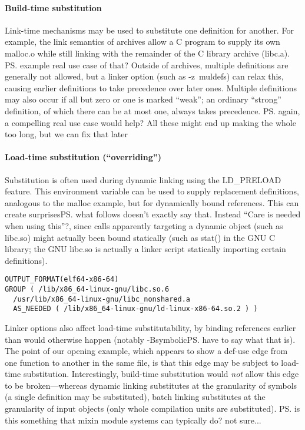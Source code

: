 \paragraph{Build-time substitution}
Link-time mechanisms may be used to substitute one definition for another.
For example, the link semantics of archives allow a C program
to supply its own \textsf{malloc.o} while still linking with 
the remainder of the C library archive (\textsf{libc.a}).
\ps{example real use case of that?}
Outside of archives, multiple definitions are generally not allowed,
but a linker option (such as \textsf{-z~muldefs}) can relax this, 
causing earlier definitions to take precedence over later ones.
Multiple definitions may also occur if all but zero or one is marked ``weak'';
an ordinary ``strong'' definition, of which there can be at most one, always takes precedence.
\ps{again, a compelling real use case would help?  All these might end up making
  the whole too long, but we can fix that later}

\paragraph{Load-time substitution (``overriding'')}
Substitution is often used during dynamic linking using the \textsf{LD\_PRELOAD}
feature. This environment variable can be used to supply replacement
definitions, analogous to the \textsf{malloc} example, but for dynamically bound references.
This can create surprises\ps{what follows doesn't exactly say
  that. Instead ``Care is needed when using this''?}, since calls apparently targeting a dynamic object 
(such as \textsf{libc.so}) might actually been bound statically
(such as \textsf{stat()} in the GNU C library; 
the GNU \textsf{libc.so} is actually a linker script 
statically importing certain definitions).

{\scriptsize\begin{lstlisting}[language=plain,basicstyle=\sffamily,columns=flexible]
OUTPUT_FORMAT(elf64-x86-64)
GROUP ( /lib/x86_64-linux-gnu/libc.so.6 
  /usr/lib/x86_64-linux-gnu/libc_nonshared.a
  AS_NEEDED ( /lib/x86_64-linux-gnu/ld-linux-x86-64.so.2 ) )
\end{lstlisting}}

Linker options also affect load-time substitutability, by 
binding references earlier than would otherwise happen (notably
\textsf{-Bsymbolic}\ps{have to say what that is}).
The point of our opening example, which appears to show a def-use edge
from one function to another in the same file, is that this edge may be subject
to load-time substitution.
Interestingly, build-time substitution would \emph{not} allow 
this edge to be broken---whereas 
dynamic linking substitutes at the granularity of symbols
(a single definition may be substituted),
batch linking substitutes at the granularity of input objects
(only whole compilation units are substituted).
\ps{is this something that mixin module systems can typically do? not sure...}

